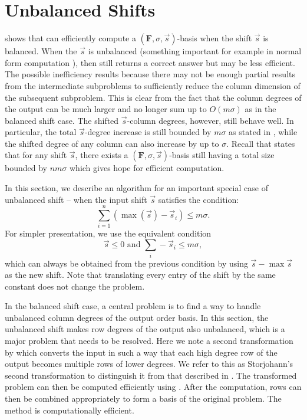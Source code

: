 
\section{Unbalanced Shifts}

\label{sec:Unbalanced-Shift}

 shows that  can efficiently
compute a $\left(\mathbf{F},\sigma,\vec{s}\right)$-basis when the
shift $\vec{s}$ is balanced. When the $\vec{s}$ is unbalanced (something
important for example in normal form computation \citep{BLV:1999,BLV:jsc06}),
then  still returns a correct answer but may be
less efficient. The possible inefficiency results because there may
not be enough partial results from the intermediate subproblems to
sufficiently reduce the column dimension of the subsequent subproblem.
This is clear from the fact that the column degrees of the output
can be much larger and no longer sum up to $O\left(m\sigma\right)$
as in the balanced shift case. The shifted $\vec{s}$-column degrees,
however, still behave well. In particular, the total $\vec{s}$-degree
increase is still bounded by $m\sigma$ as stated in ,
while the shifted degree of any column can also increase by up to
$\sigma$. Recall that  states that for any shift
$\vec{s}$, there exists a $\left(\mathbf{F},\sigma,\vec{s}\right)$-basis
still having a total size bounded by $nm\sigma$ which gives hope
for efficient computation.

In this section, we describe an algorithm for an important special
case of unbalanced shift -- when the input shift $\vec{s}$ satisfies
the condition:\[
\sum_{i=1}^{n}(\max(\vec{s})-\vec{s}_{i})\le m\sigma.\]
 For simpler presentation, we use the equivalent condition \begin{equation}
\vec{s}\le0\mbox{ and }\sum_{i}-\vec{s}_{i}\le m\sigma,\label{con:unbalancedCondition}\end{equation}
 which can always be obtained from the previous condition by using
$\vec{s}-\max\vec{s}$ as the new shift. Note that translating every
entry of the shift by the same constant does not change the problem.

In the balanced shift case, a central problem is to find a way to
handle unbalanced column degrees of the output order basis. In this
section, the unbalanced shift makes row degrees of the output also
unbalanced, which is a major problem that needs to be resolved. Here
we note a second transformation by \citet{Storjohann:2006} which
converts the input in such a way that each high degree row of the
output becomes multiple rows of lower degrees. We refer to this as
Storjohann's second transformation to distinguish it from that described
in . The transformed problem
can then be computed efficiently using . After
the computation, rows can then be combined appropriately to form a
basis of the original problem. The method is computationally efficient.

